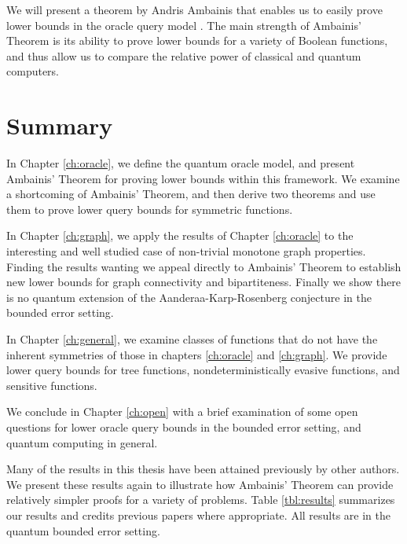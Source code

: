 We will present a theorem by Andris Ambainis that enables us to easily
prove lower bounds in the oracle query model
\cite{ambainis00quantum}.  The main strength of Ambainis' Theorem
is its ability to prove lower bounds for a variety of Boolean
functions, and thus allow us to compare the relative power of
classical and quantum computers.

\section{Summary}
\label{sec:outline}

In Chapter \ref{ch:oracle}, we define the quantum oracle model, and
present Ambainis' Theorem for proving lower bounds within this
framework.  We examine a shortcoming of Ambainis' Theorem, and then
derive two theorems and use them to prove lower query bounds for
symmetric functions.

In Chapter \ref{ch:graph}, we apply the results of Chapter
\ref{ch:oracle} to the interesting and well studied case of
non-trivial monotone graph properties.  Finding the results wanting we
appeal directly to Ambainis' Theorem to establish new lower bounds for
graph connectivity and bipartiteness.  Finally we show there is no
quantum extension of the Aanderaa-Karp-Rosenberg conjecture in the
bounded error setting.

In Chapter \ref{ch:general}, we examine classes of functions that do
not have the inherent symmetries of those in chapters \ref{ch:oracle}
and \ref{ch:graph}.  We provide lower query bounds for tree functions,
nondeterministically evasive functions, and sensitive functions.

We conclude in Chapter \ref{ch:open} with a brief examination of some
open questions for lower oracle query bounds in the bounded error
setting, and quantum computing in general.

\label{sec:sumofres}

Many of the results in this thesis have been attained previously by
other authors. We present these results again to illustrate how
Ambainis' Theorem can provide relatively simpler proofs for a variety
of problems.  Table \ref{tbl:results} summarizes our results and
credits previous papers where appropriate.  All results are in the
quantum bounded error setting.

